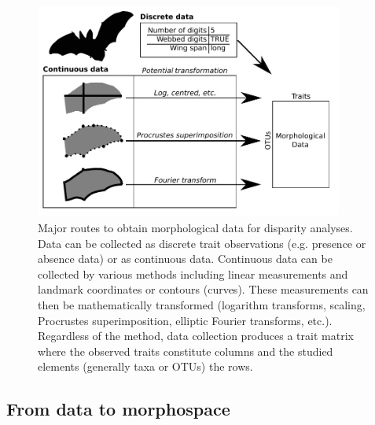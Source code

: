 \documentclass[12pt,letterpaper]{article}
\begin{document}
\begin{figure}[!htbp]
\centering
   \includegraphics[width=0.9\textwidth]{Figures/figure_data.pdf}
\caption{
    Major routes to obtain morphological data for disparity analyses. Data can be collected as discrete trait observations (e.g. presence or absence data) or as continuous data.
    Continuous data can be collected by various methods including linear measurements and landmark coordinates or contours (curves).
    These measurements can then be mathematically transformed (logarithm transforms, scaling, Procrustes superimposition, elliptic Fourier transforms, etc.).
    Regardless of the method, data collection produces a trait matrix where the observed traits constitute columns and the studied elements (generally taxa or OTUs) the rows.
}
\label{Fig:data}
\end{figure}


\subsection{From data to morphospace} \label{section:morphospace}

\end{document}
